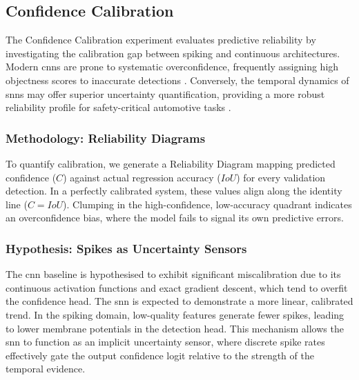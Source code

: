 \subsection{Confidence Calibration}
\label{subsec:confidence_calibration}

The Confidence Calibration experiment evaluates predictive reliability by investigating the calibration gap between spiking and continuous architectures. Modern \glspl{cnn} are prone to systematic overconfidence, frequently assigning high objectness scores to inaccurate detections \cite{guo2017calibration}. 
Conversely, the temporal dynamics of \glspl{snn} may offer superior uncertainty quantification, providing a more robust reliability profile for safety-critical automotive tasks \cite{skatchkovsky2022bayesian}.

\subsubsection{Methodology: Reliability Diagrams}
To quantify calibration, we generate a Reliability Diagram mapping predicted confidence ($C$) against actual regression accuracy ($IoU$) for every validation detection.
In a perfectly calibrated system, these values align along the identity line ($C = IoU$). 
Clumping in the high-confidence, low-accuracy quadrant indicates an overconfidence bias, where the model fails to signal its own predictive errors.

\subsubsection{Hypothesis: Spikes as Uncertainty Sensors}
The \gls{cnn} baseline is hypothesised to exhibit significant miscalibration due to its continuous activation functions and exact gradient descent, which tend to overfit the confidence head. 
The \gls{snn} is expected to demonstrate a more linear, calibrated trend. 
In the spiking domain, low-quality features generate fewer spikes, leading to lower membrane potentials in the detection head. 
This mechanism allows the \gls{snn} to function as an implicit uncertainty sensor, where discrete spike rates effectively gate the output confidence logit relative to the strength of the temporal evidence.
